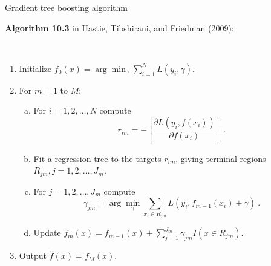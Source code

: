 \documentclass[
  10pt,
  ignorenonframetext,
]{beamer}
\providecommand{\tightlist}{%
  \setlength{\itemsep}{0pt}\setlength{\parskip}{0pt}}
\begin{document}
\begin{frame}
\begin{block}{Gradient tree boosting algorithm}
\label{gradient-tree-boosting-algorithm}
\(~\)

\textbf{Algorithm 10.3} in Hastie, Tibshirani, and Friedman (2009):

\(~\)

\begin{enumerate}
\tightlist
\item
  Initialize \(f_0(x) = \arg \min_\gamma \sum_{i=1}^N L(y_i,\gamma)\).
\end{enumerate}

\vspace{1mm}

\begin{enumerate}
\setcounter{enumi}{1}
\item
  For \(m=1\) to \(M\):

  \begin{enumerate}
  [(a)]
  \tightlist
  \item
    For \(i=1,2,\ldots, N\) compute
    \[r_{im} = - \left[ \frac{\partial L(y_i,f(x_i))}{\partial f(x_i)} \right] \ .\]
  \item
    Fit a regression tree to the targets \(r_{im}\), giving terminal
    regions \(R_{jm}, j=1,2,\ldots , J_m\).
  \end{enumerate}

  \vspace{1mm}

  \begin{enumerate}
  [(a)]
  \setcounter{enumii}{2}
  \item
    For \(j=1,2,\ldots, J_m\) compute
    \[\gamma_{jm} = \arg \min_\gamma \sum_{x_i \in R_{jm}} L(y_i, f_{m-1}(x_i) + \gamma) \ .\]
    \vspace{1mm}
  \item
    Update
    \(f_m(x)=f_{m-1}(x) + \sum_{j=1}^{J_m} \gamma_{jm}I(x\in R_{jm})\).
  \end{enumerate}
\end{enumerate}

\vspace{1mm}

\begin{enumerate}
\setcounter{enumi}{2}
\tightlist
\item
  Output \(\hat{f}(x)=f_M(x)\).
\end{enumerate}
\end{block}
\end{frame}
\end{document}

